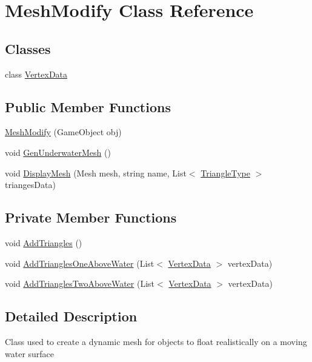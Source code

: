\hypertarget{class_mesh_modify}{}\section{Mesh\+Modify Class Reference}
\label{class_mesh_modify}
\subsection*{Classes}
\begin{DoxyCompactItemize}
\item 
class \hyperlink{class_mesh_modify_1_1_vertex_data}{Vertex\+Data}
\end{DoxyCompactItemize}
\subsection*{Public Member Functions}
\begin{DoxyCompactItemize}
\item 
\hyperlink{class_mesh_modify_a530bd2a60da92fef8e91ff5af4dc57b1}{Mesh\+Modify} (Game\+Object obj)
\item 
void \hyperlink{class_mesh_modify_a5f2b336a7955779a71bc2da2833695d1}{Gen\+Underwater\+Mesh} ()
\item 
void \hyperlink{class_mesh_modify_ad3ec1d4ecf9ba803cbfe796c9a300cc8}{Display\+Mesh} (Mesh mesh, string name, List$<$ \hyperlink{struct_triangle_type}{Triangle\+Type} $>$ trianges\+Data)
\end{DoxyCompactItemize}
\subsection*{Private Member Functions}
\begin{DoxyCompactItemize}
\item 
void \hyperlink{class_mesh_modify_a0843560bb4dcfaff495f4bc8b2e7df96}{Add\+Triangles} ()
\item 
void \hyperlink{class_mesh_modify_a0c5593a3aad880222dfa22dc4cca4384}{Add\+Triangles\+One\+Above\+Water} (List$<$ \hyperlink{class_mesh_modify_1_1_vertex_data}{Vertex\+Data} $>$ vertex\+Data)
\item 
void \hyperlink{class_mesh_modify_a97a32e877e4dcd875dac22d49b30d083}{Add\+Triangles\+Two\+Above\+Water} (List$<$ \hyperlink{class_mesh_modify_1_1_vertex_data}{Vertex\+Data} $>$ vertex\+Data)
\end{DoxyCompactItemize}


\subsection{Detailed Description}
Class used to create a dynamic mesh for objects to float realistically on a moving water surface 



